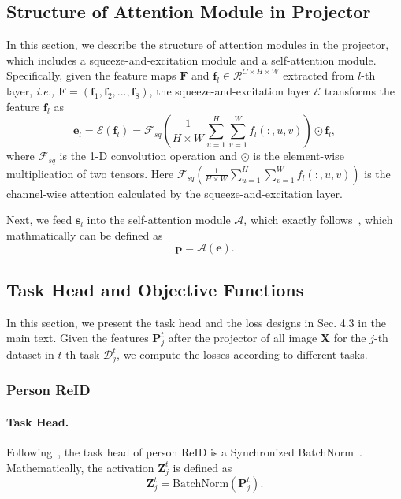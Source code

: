 \documentclass[10pt,twocolumn,letterpaper]{article}
\begin{document}
\subsection{Structure of Attention Module in Projector}
In this section, we describe the structure of attention modules in the projector, which includes a squeeze-and-excitation module and a self-attention module. Specifically, given the feature maps $\mathbf{F}$ and $\mathbf{f}_l \in \mathcal{R}^{C\times H \times W}$ extracted from $l$-th layer, \emph{i.e.,} $\mathbf{F}=(\mathbf{f}_1, \mathbf{f}_2, ..., \mathbf{f}_8)$, the squeeze-and-excitation layer $\mathcal{E}$ transforms the feature $\mathbf{f}_l$ as 
\begin{equation}
    \mathbf{e}_l = \mathcal{E}(\mathbf{f}_l) = \mathcal{F}_{sq}(\frac{1}{H \times W}\sum_{u=1}^H\sum_{v=1}^W f_l(:, u,v)) \odot \mathbf{f}_l,
\end{equation}
where $\mathcal{F}_{sq}$ is the 1-D convolution operation and $\odot$ is the element-wise multiplication of two tensors. Here $ \mathcal{F}_{sq}(\frac{1}{H \times W}\sum_{u=1}^H\sum_{v=1}^W f_l(:, u,v))$ is the channel-wise attention calculated by the squeeze-and-excitation layer.

Next, we feed $\mathbf{s}_l$ into the self-attention module $\mathcal{A}$, which exactly follows~\cite{vaswani2017attention}, which mathmatically can be defined as
\begin{equation}
    \mathbf{p} = \mathcal{A}(\mathbf{e}).
\end{equation}



\subsection{Task Head and Objective Functions}
In this section, we present the task head and the loss designs in Sec. 4.3 in the main text. Given the features $\mathbf{P}^t_j$ after the projector of all image $\mathbf{X}$ for the $j$-th dataset in $t$-th task $\mathcal{D}^t_j$, we compute the losses according to different tasks.

\subsubsection{Person ReID}
\paragraph{Task Head.} Following~\cite{luo2019bag}, the task head of person ReID is a Synchronized BatchNorm~\cite{ioffe2015batch}. Mathematically, the activation $\mathbf{Z}_j^t$ is defined as 
\begin{equation}
    \mathbf{Z}_j^t = \text{BatchNorm}(\mathbf{P}_j^t).
\end{equation}
\end{document}
